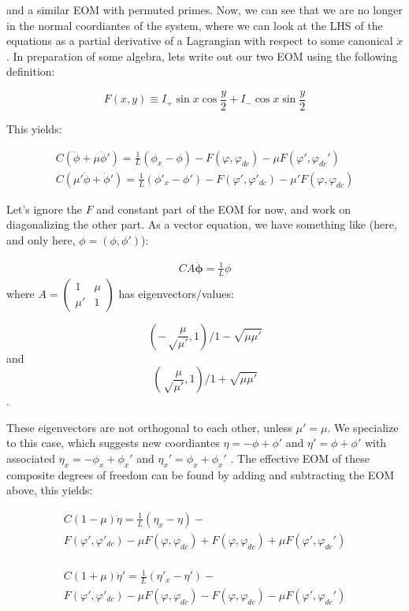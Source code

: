 \documentclass[paper=a4, twocolumn, fontsize=10pt]{article} %
\numberwithin{equation}{section} %
\numberwithin{figure}{section} %
\numberwithin{table}{section} %
\begin{document}
and a similar EOM with permuted primes. Now, we can see that we are no longer in the normal coordiantes of the system, where we can look at the LHS of the equations as a partial derivative of a Lagrangian with respect to some canonical $\dot{x}$. In preparation of some algebra, lets write out our two EOM using the following definition:

\[ F(x,y) \equiv I_{+} \sin x \cos \frac{y}{2} + I_{-} \cos x \sin \frac{y}{2} \]

This yields:

\begin{align}
    C \left( \ddot{\phi} + \mu \ddot{\phi}'\right) = \frac{1}{L} (\phi_x-\phi) - F(\varphi, \varphi_{dc}) - \mu F(\varphi',\varphi_{dc}')
    \\
    C \left( \mu' \ddot{\phi} + \ddot{\phi}'\right) = \frac{1}{L} (\phi'_x-\phi') - F(\varphi', \varphi'_{dc}) - \mu' F(\varphi,\varphi_{dc})
\end{align}

Let's ignore the $F$ and constant part of the EOM for now, and work on diagonalizing the other part. As a vector equation, we have something like (here, and only here, $\phi = (\phi, \phi')$):

\begin{align}{
    C A \ddot{\mathbf{\phi}} = \frac{1}{L} \phi 
}
\end{align}
where $A = \begin{pmatrix} 1 & \mu \\ \mu' & 1 \end{pmatrix}  $ has eigenvectors/values:

\[  (-\sqrt\frac{\mu}{\mu'}, 1)/1-\sqrt{\mu\mu'}\]
 and 
 \[ (\sqrt\frac{\mu}{\mu'}, 1)/1+\sqrt{\mu\mu'}\]. 
 
 These eigenvectors are not orthogonal to each other, unless $\mu'=\mu$. We specialize to this case, which suggests new coordiantes $\eta = -\phi +\phi'$ and $\eta' = \phi+\phi'$ with associated $\eta_x = -\phi_x + \phi_x'$ and $\eta_x' = \phi_x + \phi_x'$ . The effective EOM of these composite degrees of freedom can be found by adding and subtracting the EOM above, this yields:

\begin{multline}
    C(1-\mu) \ddot{\eta} = \frac{1}{L} (\eta_x-\eta) - \\ F(\varphi', \varphi'_{dc}) - \mu F(\varphi,\varphi_{dc}) + F(\varphi, \varphi_{dc}) + \mu F(\varphi',\varphi_{dc}')
\end{multline}
    \\
\begin{multline}
    C(1+\mu) \ddot{\eta}' = \frac{1}{L} (\eta'_x-\eta') - \\ F(\varphi', \varphi'_{dc}) - \mu F(\varphi,\varphi_{dc}) - F(\varphi, \varphi_{dc}) - \mu F(\varphi',\varphi_{dc}')
\end{multline}
\end{document}
